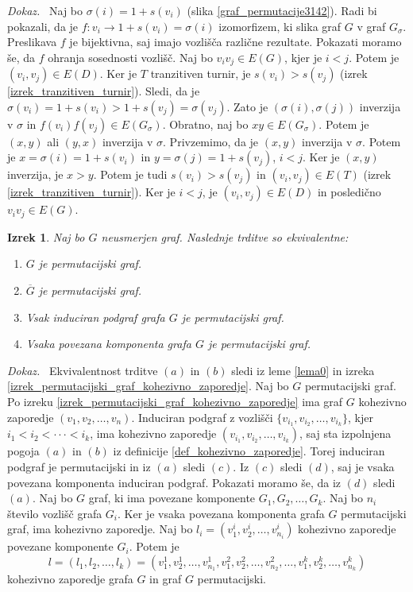 \documentclass[a4paper, 12pt]{book}
\newtheorem{izrek}{Izrek}[chapter]
\newenvironment{dokaz}{\emph{Dokaz.}\ }{\hspace{\fill}{$\Box$}}
\begin{document}
\begin{dokaz}
    Naj bo $\sigma(i) = 1 + s(v_i)$ (slika \ref{graf_permutacije3142}). Radi bi pokazali, da je $f: v_i \rightarrow 1 + s(v_i) = \sigma(i)$ izomorfizem, ki slika graf $G$ v graf $G_{\sigma}$. Preslikava $f$ je bijektivna, saj imajo vozlišča različne rezultate. Pokazati moramo še, da $f$ ohranja sosednosti vozlišč. Naj bo $v_iv_j \in E(G)$, kjer je $i < j$. Potem je $(v_i, v_j) \in E(D)$. Ker je $T$ tranzitiven turnir, je $s(v_i) > s(v_j)$ (izrek \ref{izrek_tranzitiven_turnir}). Sledi, da je $\sigma(v_i) = 1 + s(v_i) > 1 + s(v_j) = \sigma(v_j)$. Zato je $(\sigma(i), \sigma(j))$ inverzija v $\sigma$ in $f(v_i)f(v_j) \in E(G_{\sigma})$. Obratno, naj bo $xy \in E(G_{\sigma})$. Potem je $(x, y)$ ali $(y, x)$ inverzija v $\sigma$. Privzemimo, da je $(x, y)$ inverzija v $\sigma$. Potem je $x = \sigma(i) = 1 + s(v_i)$ in $y = \sigma(j) = 1 + s(v_j)$, $i < j$. Ker je $(x, y)$ inverzija, je $x > y$. Potem je tudi $s(v_i) > s(v_j)$ in $(v_i, v_j) \in E(T)$ (izrek \ref{izrek_tranzitiven_turnir}). Ker je $i < j$, je $(v_i, v_j) \in E(D)$ in posledično $v_iv_j \in E(G)$.
\end{dokaz}


\begin{izrek}
\label{izrek_ekvivalentne_trditve_permutacijski_graf}
    Naj bo $G$ neusmerjen graf. Naslednje trditve so ekvivalentne:
    \begin{enumerate}[label=(\alph*)]
        \item $G$ je permutacijski graf.
        \item $\overline{G}$ je permutacijski graf.
        \item Vsak induciran podgraf grafa $G$ je permutacijski graf.
        \item Vsaka povezana komponenta grafa $G$ je permutacijski graf.
    \end{enumerate}
\end{izrek}
\begin{dokaz}
    Ekvivalentnost trditve $(a)$ in $(b)$ sledi iz leme \ref{lema0} in izreka \ref{izrek_permutacijski_graf_kohezivno_zaporedje}. Naj bo $G$ permutacijski graf. Po izreku \ref{izrek_permutacijski_graf_kohezivno_zaporedje} ima graf $G$ kohezivno zaporedje $(v_1, v_2, \dots, v_n)$. Induciran podgraf z vozlišči $\{ v_{i_1}, v_{i_2}, \dots, v_{i_k} \}$, kjer $i_1 < i_2 < \cdot\cdot\cdot < i_k$, ima kohezivno zaporedje $(v_{i_1}, v_{i_2}, \dots, v_{i_k})$, saj sta izpolnjena pogoja $(a)$ in $(b)$ iz definicije \ref{def_kohezivno_zaporedje}. Torej induciran podgraf je permutacijski in iz $(a)$ sledi $(c)$. Iz $(c)$ sledi $(d)$, saj je vsaka povezana komponenta induciran podgraf. Pokazati moramo še, da iz $(d)$ sledi $(a)$. Naj bo $G$ graf, ki ima povezane komponente $G_1, G_2, \dots, G_k$. Naj bo $n_i$ število vozlišč grafa $G_i$. Ker je vsaka povezana komponenta grafa $G$ permutacijski graf, ima kohezivno zaporedje. Naj bo $l_i = (v_1^i, v_2^i, \dots, v_{n_i}^i)$ kohezivno zaporedje povezane komponente $G_i$. Potem je 
    \[
        l = (l_1, l_2, \dots, l_k) = (v_1^1, v_2^1, \dots, v_{n_1}^1, v_1^2, v_2^2, \dots, v_{n_2}^2, \dots, v_1^k, v_2^k, \dots, v_{n_k}^k)
    \]
         kohezivno zaporedje grafa $G$ in graf $G$ permutacijski. 
\end{dokaz}
\end{document}

